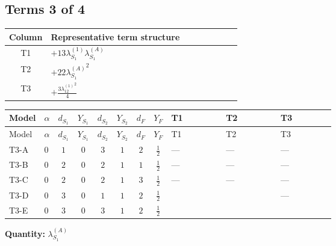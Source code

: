 \documentclass[8pt]{article}
\begin{document}
\begin{landscape}
\subsection*{Terms 3 of 4}
\begin{center}
\begin{tabular}{@{}c >{\raggedright\arraybackslash}p{0.82\linewidth}@{}}
\toprule
Column & Representative term structure \\
\midrule
T1 & \(\displaystyle +13 {\lambda_{S_1}^{(1)}} {\lambda_{S_1}^{(A)}}\) \\
\midrule
T2 & \(\displaystyle +22 {\lambda_{S_1}^{(A)}}^2\) \\
\midrule
T3 & \(\displaystyle +\frac{3 {\lambda_{12}^{(1)}}^2}{4}\) \\
\midrule
\bottomrule
\end{tabular}
\end{center}
\smallskip
\tiny
\begin{longtable}{@{}llcccccc >{\raggedright\arraybackslash}p{0.21\linewidth} >{\raggedright\arraybackslash}p{0.21\linewidth} >{\raggedright\arraybackslash}p{0.21\linewidth}@{}}
\toprule
Model & $\alpha$ & $d_{S_1}$ & $Y_{S_1}$ & $d_{S_2}$ & $Y_{S_2}$ & $d_F$ & $Y_F$ & T1 & T2 & T3 \\
\midrule
\endfirsthead
\toprule
Model & $\alpha$ & $d_{S_1}$ & $Y_{S_1}$ & $d_{S_2}$ & $Y_{S_2}$ & $d_F$ & $Y_F$ & T1 & T2 & T3 \\
\midrule
\endhead
T3-A & $0$ & $1$ & $0$ & $3$ & $1$ & $2$ & $\frac{1}{2}$ & --- & --- & --- \\
\midrule
T3-B & $0$ & $2$ & $0$ & $2$ & $1$ & $1$ & $\frac{1}{2}$ & --- & --- & --- \\
\midrule
T3-C & $0$ & $2$ & $0$ & $2$ & $1$ & $3$ & $\frac{1}{2}$ & --- & --- & --- \\
\midrule
T3-D & $0$ & $3$ & $0$ & $1$ & $1$ & $2$ & $\frac{1}{2}$ & \scriptsize\adjustbox{max width=\linewidth}{$\begin{gathered} +13 {\lambda_{S_1}^{(1)}} {\lambda_{S_1}^{(A)}}\end{gathered}$} & \scriptsize\adjustbox{max width=\linewidth}{$\begin{gathered} +22 {\lambda_{S_1}^{(A)}}^2\end{gathered}$} & --- \\
\midrule
T3-E & $0$ & $3$ & $0$ & $3$ & $1$ & $2$ & $\frac{1}{2}$ & \scriptsize\adjustbox{max width=\linewidth}{$\begin{gathered} +13 {\lambda_{S_1}^{(1)}} {\lambda_{S_1}^{(A)}}\end{gathered}$} & \scriptsize\adjustbox{max width=\linewidth}{$\begin{gathered} +22 {\lambda_{S_1}^{(A)}}^2\end{gathered}$} & \scriptsize\adjustbox{max width=\linewidth}{$\begin{gathered} +\frac{3 {\lambda_{12}^{(1)}}^2}{4}\end{gathered}$} \\
\midrule
\bottomrule
\end{longtable}
\clearpage
\noindent\textbf{Quantity: }$\lambda_{S_1}^{(A)}$\par\smallskip

\end{landscape}
\end{document}
